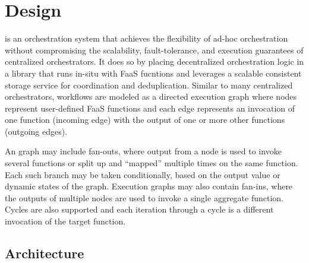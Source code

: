 \section{\name{} Design}\label{sec:design}

\name{} is an orchestration system that achieves the flexibility of ad-hoc
orchestration without compromising the scalability, fault-tolerance, and
execution guarantees of centralized orchestrators. It does so by placing
decentralized orchestration logic in a library that runs in-situ with FaaS
fucntions and leverages a scalable consistent storage service for coordination
and deduplication. Similar to many centralized orchestrators, \name{} workflows
are modeled as a directed execution graph where nodes represent user-defined
FaaS functions and each edge represents an invocation of one function (incoming
edge) with the output of one or more other functions (outgoing edges).

An \name{} graph may include fan-outs, where output from a node is used to
invoke several functions or split up and ``mapped'' multiple times on the same
function. Each such branch may be taken conditionally, based on the output value
or dynamic states of the graph. Execution graphs may also contain fan-ins, where
the outputs of multiple nodes are used to invoke a single aggregate function.
Cycles are also supported and each iteration through a cycle is a different
invocation of the target function.

\subsection{Architecture}\label{sec:design:architecture}

